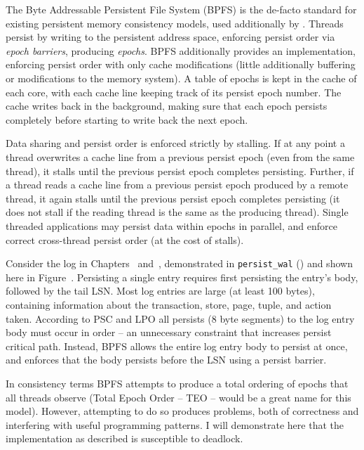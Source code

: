 The Byte Addressable Persistent File System (BPFS)  is the de-facto standard for existing persistent memory consistency models, used additionally by .
Threads persist by writing to the persistent address space, enforcing persist order via \emph{epoch barriers}, producing \emph{epochs}.
BPFS additionally provides an implementation, enforcing persist order with only cache modifications (little additionally buffering or modifications to the memory system).
A table of epochs is kept in the cache of each core, with each cache line keeping track of its persist epoch number.
The cache writes back in the background, making sure that each epoch persists completely before starting to write back the next epoch.

Data sharing and persist order is enforced strictly by stalling.
If at any point a thread overwrites a cache line from a previous persist epoch (even from the same thread), it stalls until the previous persist epoch completes persisting.
Further, if a thread reads a cache line from a previous persist epoch produced by a remote thread, it again stalls until the previous persist epoch completes persisting (it does not stall if the reading thread is the same as the producing thread).
Single threaded applications may persist data within epochs in parallel, and enforce correct cross-thread persist order (at the cost of stalls).



Consider the log in Chapters~ and~, demonstrated in \texttt{persist\_wal} () and shown here in Figure~.
Persisting a single entry requires first persisting the entry's body, followed by the tail LSN.
Most log entries are large (at least 100 bytes), containing information about the transaction, store, page, tuple, and action taken.
According to PSC and LPO all persists (8 byte segments) to the log entry body must occur in order -- an unnecessary constraint that increases persist critical path.
Instead, BPFS allows the entire log entry body to persist at once, and enforces that the body persists before the LSN using a persist barrier.

In consistency terms BPFS attempts to produce a total ordering of epochs that all threads observe (Total Epoch Order -- TEO -- would be a great name for this model).
However, attempting to do so produces problems, both of correctness and interfering with useful programming patterns.
I will demonstrate here that the implementation as described is susceptible to deadlock.

